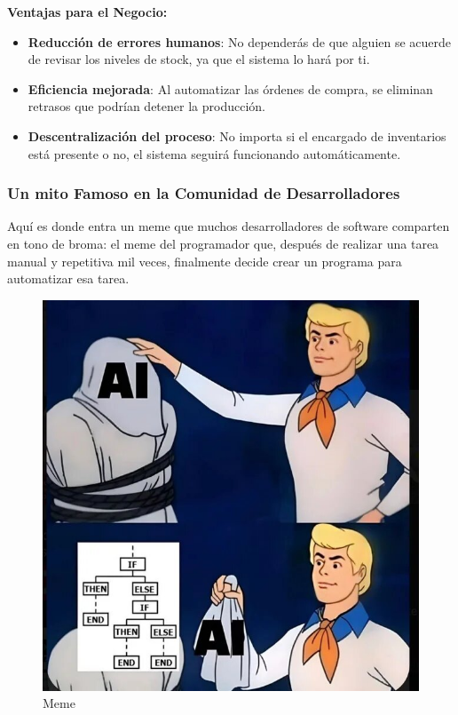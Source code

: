 \documentclass[
  10pt,
  letterpaper,
]{book}
\providecommand{\tightlist}{%
  \setlength{\itemsep}{0pt}\setlength{\parskip}{0pt}}\usepackage{longtable,booktabs,array}
\begin{document}
\textbf{Ventajas para el Negocio:}

\begin{itemize}
\tightlist
\item
  \textbf{Reducción de errores humanos}: No dependerás de que alguien se
  acuerde de revisar los niveles de stock, ya que el sistema lo hará por
  ti.
\item
  \textbf{Eficiencia mejorada}: Al automatizar las órdenes de compra, se
  eliminan retrasos que podrían detener la producción.
\item
  \textbf{Descentralización del proceso}: No importa si el encargado de
  inventarios está presente o no, el sistema seguirá funcionando
  automáticamente.
\end{itemize}

\subsubsection{Un mito Famoso en la Comunidad de
Desarrolladores}\label{un-mito-famoso-en-la-comunidad-de-desarrolladores}

Aquí es donde entra un meme que muchos desarrolladores de software
comparten en tono de broma: el meme del programador que, después de
realizar una tarea manual y repetitiva mil veces, finalmente decide
crear un programa para automatizar esa tarea.

\begin{figure}[H]

{\centering \includegraphics{Img/ia.jpg}

}

\caption{Meme}

\end{figure}%
\end{document}
